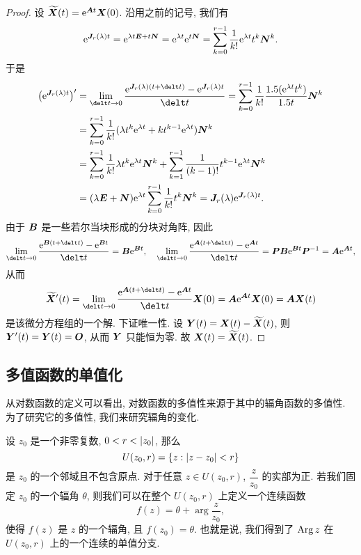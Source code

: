 \begin{proof}
  设 $\widetilde{{\boldsymbol{X}}}(t)=\mathrm{e}^{{\boldsymbol{A}} t}{\boldsymbol{X}}(0)$.
  沿用之前的记号, 我们有
  \[
     \mathrm{e}^{{\boldsymbol{J}}_r(\lambda)t}
    =\mathrm{e}^{\lambda t{\boldsymbol{E}}+t{\boldsymbol{N}}}
    =\mathrm{e}^{\lambda t}\mathrm{e}^{t{\boldsymbol{N}}}
    =\sum_{k=0}^{r-1}\frac1{k!}\mathrm{e}^{\lambda t}t^k{\boldsymbol{N}}^k.
  \]
  于是
  \begin{align*}
      \bigl(\ee^{\bfJ_r(\lambda)t}\bigr)'&
    =\lim_{\delt t\ra 0}\frac{\ee^{\bfJ_r(\lambda)(t+\delt t)}-\ee^{\bfJ_r(\lambda)t}}{\delt t}
    =\sum_{k=0}^{r-1}\frac1{k!}\frac{\d(\ee^{\lambda t}t^k)}{\d t}\bfN^k\\&
    =\sum_{k=0}^{r-1}\frac1{k!}(\lambda t^k\ee^{\lambda t}+kt^{k-1}\ee^{\lambda t})\bfN^k\\&
    =\sum_{k=0}^{r-1}\frac1{k!}\lambda t^k\ee^{\lambda t}\bfN^k+\sum_{k=1}^{r-1}\frac1{(k-1)!}t^{k-1}\ee^{\lambda t}\bfN^k\\&
    =(\lambda\bfE+\bfN)\ee^{\lambda t}\sum_{k=0}^{r-1}\frac1{k!}t^k\bfN^k
    =\bfJ_r(\lambda)\ee^{\bfJ_r(\lambda)t}.
  \end{align*}
  由于 ${\boldsymbol{B}}$ 是一些若尔当块形成的分块对角阵, 因此
  \[
     \lim_{\delt t\ra 0}\frac{\ee^{\bfB(t+\delt t)}-\ee^{\bfB t}}{\delt t}
    =\bfB\ee^{\bfB t},\quad
     \lim_{\delt t\ra 0}\frac{\ee^{\bfA(t+\delt t)}-\ee^{\bfA t}}{\delt t}
    =\bfP\bfB\ee^{\bfB t}\bfP^{-1}
    =\bfA\ee^{\bfA t},
  \]
  从而
  \[
     \wt\bfX'(t)
    =\lim_{\delt t\ra 0}\frac{\ee^{\bfA(t+\delt t)}-\ee^{\bfA t}}{\delt t}\bfX(0)
    =\bfA\ee^{\bfA t}\bfX(0)
    =\bfA\bfX(t)
  \]
  是该微分方程组的一个解.
  下证唯一性.
  设 ${\boldsymbol{Y}}(t)={\boldsymbol{X}}(t)-\widetilde{{\boldsymbol{X}}}(t)$, 则 ${\boldsymbol{Y}}'(t)={\boldsymbol{Y}}(t)={\boldsymbol{O}}$, 从而 ${\boldsymbol{Y}}$ 只能恒为零.
  故 ${\boldsymbol{X}}(t)=\widetilde{{\boldsymbol{X}}}(t)$.
\end{proof}



\subsection{多值函数的单值化\optional}

从对数函数的定义可以看出, 对数函数的多值性来源于其中的辐角函数的多值性.
为了研究它的多值性, 我们来研究辐角的变化.

设 $z_0$ 是一个非零复数, $0<r<\lvert z_0\rvert$, 那么
\[
  U(z_0,r)=\{z\mathrel{:} \lvert z-z_0\rvert<r\}
\]
是 $z_0$ 的一个邻域且不包含原点.
对于任意 $z\in U(z_0,r)$, $\dfrac z{z_0}$ 的实部为正.
若我们固定 $z_0$ 的一个辐角 $\theta$, 则我们可以在整个 $U(z_0,r)$ 上定义一个连续函数
\[
  f(z)=\theta+\arg\frac z{z_0},
\]
使得 $f(z)$ 是 $z$ 的一个辐角, 且 $f(z_0)=\theta$.
也就是说, 我们得到了 $\operatorname{Arg} z$ 在 $U(z_0,r)$ 上的一个连续的单值分支.

